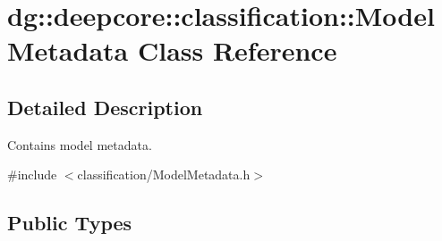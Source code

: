 \hypertarget{classdg_1_1deepcore_1_1classification_1_1_model_metadata}{}\section{dg\+:\+:deepcore\+:\+:classification\+:\+:Model\+Metadata Class Reference}
\label{classdg_1_1deepcore_1_1classification_1_1_model_metadata}


\subsection{Detailed Description}
Contains model metadata. 

{\ttfamily \#include $<$classification/\+Model\+Metadata.\+h$>$}

\subsection*{Public Types}
